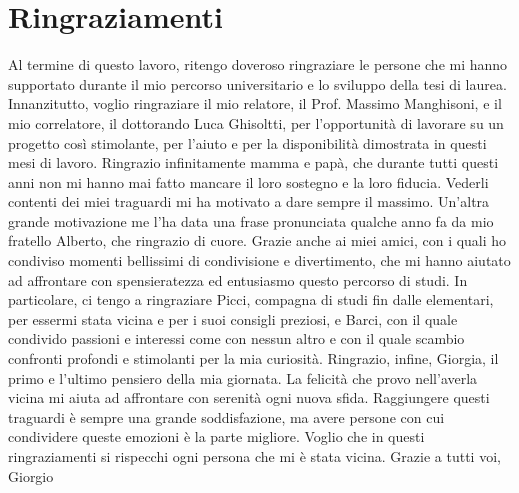 \chapter*{Ringraziamenti}
Al termine di questo lavoro, ritengo doveroso ringraziare le persone che mi hanno supportato durante il mio percorso universitario e lo 
sviluppo della tesi di laurea.
\newline \newline Innanzitutto, voglio ringraziare il mio relatore, il Prof. Massimo Manghisoni, e il mio correlatore, il dottorando Luca Ghisoltti, per 
l'opportunità di lavorare su un progetto così stimolante, per l'aiuto e per la disponibilità dimostrata in questi mesi di lavoro.
\newline \newline Ringrazio infinitamente mamma e papà, che durante tutti questi anni non mi hanno mai fatto mancare il loro sostegno e la loro fiducia. 
Vederli contenti dei miei traguardi mi ha motivato a dare sempre il massimo. Un'altra grande motivazione me l'ha data una frase pronunciata 
qualche anno fa da mio fratello Alberto, che ringrazio di cuore.
\newline \newline Grazie anche ai miei amici, con i quali ho condiviso momenti bellissimi di condivisione e divertimento, che mi hanno aiutato ad affrontare 
con spensieratezza ed entusiasmo questo percorso di studi. In particolare, ci tengo a ringraziare Picci, compagna di studi fin dalle 
elementari, per essermi stata vicina e per i suoi consigli preziosi, e Barci, con il quale condivido passioni e interessi come con 
nessun altro e con il quale scambio confronti profondi e stimolanti per la mia curiosità.
\newline \newline Ringrazio, infine, Giorgia, il primo e l'ultimo pensiero della mia giornata. La felicità che provo nell'averla vicina mi aiuta ad affrontare 
con serenità ogni nuova sfida.
\newline \newline Raggiungere questi traguardi è sempre una grande soddisfazione, ma avere persone con cui condividere queste emozioni è la parte 
migliore. Voglio che in questi ringraziamenti si rispecchi ogni persona che mi è stata vicina.
\newline \newline Grazie a tutti voi,
\newline Giorgio